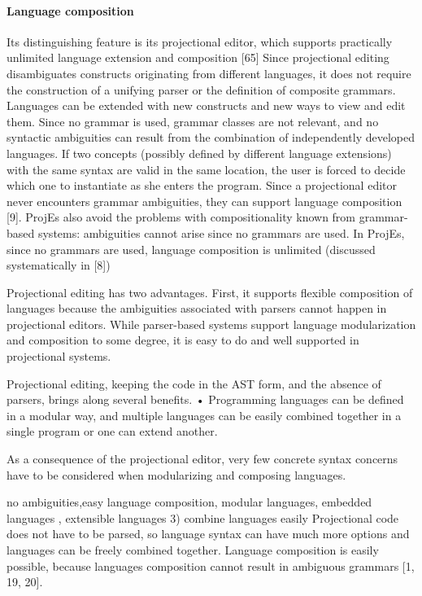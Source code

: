 \paragraph{Language composition}
Its distinguishing feature is its projectional editor, which supports practically unlimited language extension and composition [65]
Since projectional editing disambiguates constructs originating from different languages, it does not require the construction of a unifying parser or the definition of composite grammars.
Languages can be extended with new constructs and new ways to view and edit them.
Since no grammar is used, grammar classes are not relevant, and no syntactic ambiguities can result from the combination of independently developed languages.
If two concepts (possibly defined by different language extensions) with the same syntax are valid in the same location, the user is forced to decide which one to instantiate as she enters the program.
Since a projectional editor never encounters grammar ambiguities, they can support language composition [9].
ProjEs also avoid the problems with compositionality known from grammar-based systems:
ambiguities cannot arise since no grammars are used.
In ProjEs, since no grammars are used, language composition is unlimited (discussed systematically in [8])

Projectional editing has two advantages.
First, it supports flexible composition of languages because the ambiguities associated with parsers cannot happen in projectional editors.
While parser-based systems support language modularization and composition to some degree, it is easy to do and well supported in projectional systems.

Projectional editing, keeping the code in the AST form, and the absence of parsers, brings along several benefits.
• Programming languages can be defined in a modular way, and multiple languages can be easily combined together in a single program or one can extend another.

As a consequence of the projectional editor, very few concrete syntax concerns have to be considered when modularizing and composing languages.

no ambiguities,easy language composition, modular languages, embedded languages , extensible languages
3) combine languages easily
Projectional code does not have to be parsed, so language syntax can have much more options and languages can be freely combined together.
Language composition is easily possible, because languages composition cannot result in ambiguous grammars [1, 19, 20].

